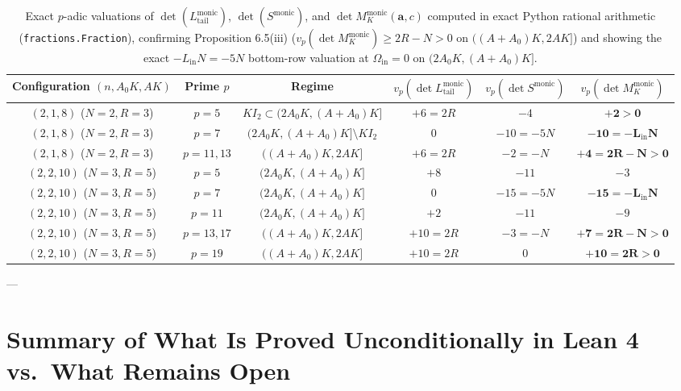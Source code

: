 \documentclass[11pt,a4paper]{article}
\begin{document}
\begin{table}[h!]
\centering
\small
\begin{tabular}{cccccc}
\toprule
Configuration $(n, A_0 K, AK)$ & Prime $p$ & Regime & $v_p(\det L_{\mathrm{tail}}^{\mathrm{monic}})$ & $v_p(\det S^{\mathrm{monic}})$ & $v_p(\det M_K^{\mathrm{monic}})$ \\
\midrule
$(2, 1, 8)$ ($N=2, R=3$) & $p = 5$ & $K I_2 \subset (2A_0 K, (A+A_0)K]$ & $+6 = 2R$ & $-4$ & $\mathbf{+2 > 0}$ \\
$(2, 1, 8)$ ($N=2, R=3$) & $p = 7$ & $(2A_0 K, (A+A_0)K] \setminus K I_2$ & $0$ & $-10 = -5N$ & $\mathbf{-10 = -L_{\mathrm{in}}N}$ \\
$(2, 1, 8)$ ($N=2, R=3$) & $p = 11, 13$ & $((A+A_0)K, 2AK]$ & $+6 = 2R$ & $-2 = -N$ & $\mathbf{+4 = 2R - N > 0}$ \\
\midrule
$(2, 2, 10)$ ($N=3, R=5$) & $p = 5$ & $(2A_0 K, (A+A_0)K]$ & $+8$ & $-11$ & $-3$ \\
$(2, 2, 10)$ ($N=3, R=5$) & $p = 7$ & $(2A_0 K, (A+A_0)K]$ & $0$ & $-15 = -5N$ & $\mathbf{-15 = -L_{\mathrm{in}}N}$ \\
$(2, 2, 10)$ ($N=3, R=5$) & $p = 11$ & $(2A_0 K, (A+A_0)K]$ & $+2$ & $-11$ & $-9$ \\
$(2, 2, 10)$ ($N=3, R=5$) & $p = 13, 17$ & $((A+A_0)K, 2AK]$ & $+10 = 2R$ & $-3 = -N$ & $\mathbf{+7 = 2R - N > 0}$ \\
$(2, 2, 10)$ ($N=3, R=5$) & $p = 19$ & $((A+A_0)K, 2AK]$ & $+10 = 2R$ & $0$ & $\mathbf{+10 = 2R > 0}$ \\
\bottomrule
\end{tabular}
\caption{Exact $p$-adic valuations of $\det(L_{\mathrm{tail}}^{\mathrm{monic}})$, $\det(S^{\mathrm{monic}})$, and $\det M_K^{\mathrm{monic}}(\mathbf{a}, c)$ computed in exact Python rational arithmetic (\texttt{fractions.Fraction}), confirming Proposition 6.5(iii) ($v_p(\det M_K^{\mathrm{monic}}) \ge 2R - N > 0$ on $((A+A_0)K, 2AK]$) and showing the exact $-L_{\mathrm{in}}N = -5N$ bottom-row valuation at $\Omega_{\mathrm{in}} = 0$ on $(2A_0 K, (A+A_0)K]$.}
\label{tab:exact_vp}
\end{table}

---

\section{Summary of What Is Proved Unconditionally in Lean 4 vs.\ What Remains Open}
\end{document}
